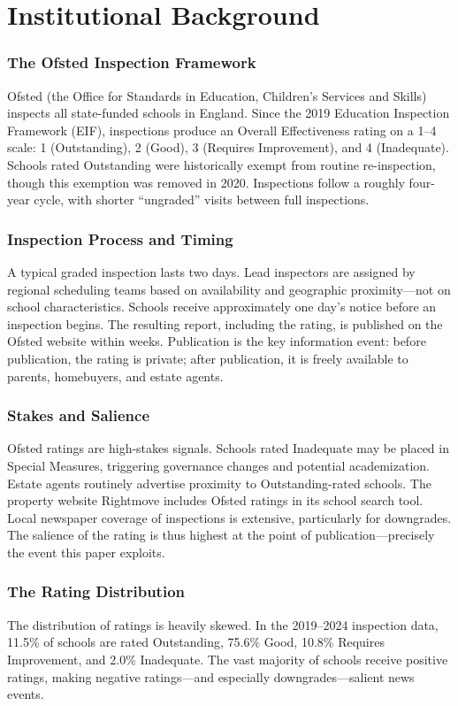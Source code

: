 \documentclass[12pt]{article}
\begin{document}
\section{Institutional Background}

\subsubsection*{The Ofsted Inspection Framework} Ofsted (the Office for Standards in Education, Children's Services and Skills) inspects all state-funded schools in England. Since the 2019 Education Inspection Framework (EIF), inspections produce an Overall Effectiveness rating on a 1--4 scale: 1 (Outstanding), 2 (Good), 3 (Requires Improvement), and 4 (Inadequate). Schools rated Outstanding were historically exempt from routine re-inspection, though this exemption was removed in 2020. Inspections follow a roughly four-year cycle, with shorter ``ungraded'' visits between full inspections.

\subsubsection*{Inspection Process and Timing} A typical graded inspection lasts two days. Lead inspectors are assigned by regional scheduling teams based on availability and geographic proximity---not on school characteristics. Schools receive approximately one day's notice before an inspection begins. The resulting report, including the rating, is published on the Ofsted website within weeks. Publication is the key information event: before publication, the rating is private; after publication, it is freely available to parents, homebuyers, and estate agents.

\subsubsection*{Stakes and Salience} Ofsted ratings are high-stakes signals. Schools rated Inadequate may be placed in Special Measures, triggering governance changes and potential academization. Estate agents routinely advertise proximity to Outstanding-rated schools. The property website Rightmove includes Ofsted ratings in its school search tool. Local newspaper coverage of inspections is extensive, particularly for downgrades. The salience of the rating is thus highest at the point of publication---precisely the event this paper exploits.

\subsubsection*{The Rating Distribution} The distribution of ratings is heavily skewed. In the 2019--2024 inspection data, 11.5\% of schools are rated Outstanding, 75.6\% Good, 10.8\% Requires Improvement, and 2.0\% Inadequate. The vast majority of schools receive positive ratings, making negative ratings---and especially downgrades---salient news events.
\end{document}
